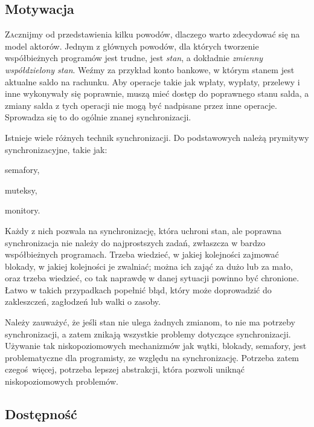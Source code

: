 \documentclass[oneside, 12pt, a4paper]{article}
\begin{document}
\begin{multicols}{2} %

\section{Motywacja}

\lettrine[nindent=0em,lines=3]{Z}acznijmy od przedstawienia kilku powodów, dlaczego warto zdecydować się na model aktorów.
Jednym z głównych powodów, dla których tworzenie współbieżnych programów jest trudne, jest \emph{stan}, a dokładnie \emph{zmienny współdzielony stan}. Weźmy za przykład konto bankowe, w którym stanem jest aktualne saldo na rachunku. Aby operacje takie jak wpłaty, wypłaty, przelewy i inne wykonywały się poprawnie, muszą mieć dostęp do poprawnego stanu salda, a zmiany salda z tych operacji nie mogą być nadpisane przez inne operacje. Sprowadza się to do ogólnie znanej synchronizacji.

Istnieje wiele różnych technik synchronizacji. Do podstawowych należą prymitywy synchronizacyjne, takie jak:
\begin{compactitem}
\item semafory,
\item muteksy,
\item monitory.
\end{compactitem}
Każdy z nich pozwala na synchronizację, która uchroni stan, ale poprawna synchronizacja nie należy do najprostszych zadań, zwłaszcza w bardzo współbieżnych programach. Trzeba wiedzieć, w jakiej kolejności zajmować blokady, w jakiej kolejności je zwalniać; można ich zająć za dużo lub za mało, oraz trzeba wiedzieć, co tak naprawdę w danej sytuacji powinno być chronione. Łatwo w takich przypadkach popełnić błąd, który może doprowadzić do zakleszczeń, zagłodzeń lub walki o zasoby. 

Należy zauważyć, że jeśli stan nie ulega żadnych zmianom, to nie ma potrzeby synchronizacji, a zatem znikają wszystkie problemy dotyczące synchronizacji. Używanie tak niskopoziomowych mechanizmów jak wątki, blokady, semafory, jest problematyczne dla programisty, ze względu na synchronizację. Potrzeba zatem czegoś więcej, potrzeba lepszej abstrakcji, która pozwoli uniknąć niskopoziomowych problemów.

\subsection{Dostępność}


\end{multicols}
\end{document}
